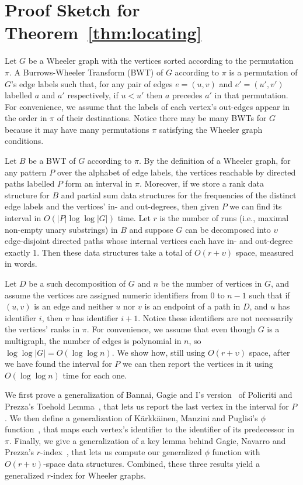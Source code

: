 
\section{Proof Sketch for Theorem~\ref{thm:locating}}
\label{app:locating}

Let $G$ be a Wheeler graph with the vertices sorted according to the permutation~$\pi$.  A Burrows-Wheeler Transform (BWT) of $G$ according to $\pi$ is a permutation of $G$'s edge labels such that, for any pair of edges $e = (u, v)$ and $e' = (u', v')$ labelled $a$ and $a'$ respectively, if $u < u'$ then $a$ precedes $a'$ in that permutation.  For convenience, we assume that the labels of each vertex's out-edges appear in the order in $\pi$ of their destinations.  Notice there may be many BWTs for $G$ because it may have many permutations $\pi$ satisfying the Wheeler graph conditions.

Let $B$ be a BWT of $G$ according to $\pi$.  By the definition of a Wheeler graph, for any pattern $P$ over the alphabet of edge labels, the vertices reachable by directed paths labelled $P$ form an interval in $\pi$.  Moreover, if we store a rank data structure for $B$ and partial sum data structures for the frequencies of the distinct edge labels and the vertices' in- and out-degrees, then given $P$ we can find its interval in $O (|P| \log \log |G|)$ time.  Let $r$ is the number of runs (i.e., maximal non-empty unary substrings) in $B$ and suppose $G$ can be decomposed into $\upsilon$ edge-disjoint directed paths whose internal vertices each have in- and out-degree exactly 1.  Then these data  structures take a total of $O (r + \upsilon)$ space, measured in words.

Let $D$ be a such decomposition of $G$ and $n$ be the number of vertices in $G$, and assume the vertices are assigned numeric identifiers from 0 to $n - 1$ such that if $(u, v)$ is an edge and neither $u$ nor $v$ is an endpoint of a path in $D$, and $u$ has identifier $i$, then $v$ has identifier $i + 1$.  Notice these identifiers are not necessarily the vertices' ranks in $\pi$.  For convenience, we assume that even though $G$ is a multigraph, the number of edges is polynomial in $n$, so $\log \log |G| = O (\log \log n)$.  We show how, still using $O (r + \upsilon)$ space, after we have found the interval for $P$ we can then report the vertices in it using $O (\log \log n)$ time for each one.

We first prove a generalization of Bannai, Gagie and I's version~\cite{bannai2020refining} of Policriti and Prezza's Toehold Lemma~\cite{policriti2018lz77}, that lets us report the last vertex in the interval for $P$.  We then define a generalization of K\"arkk\"ainen, Manzini and Puglisi's $\phi$ function~\cite{karkkainen2009permuted}, that maps each vertex's identifier to the identifier of its predecessor in $\pi$.  Finally, we give a generalization of a key lemma behind Gagie, Navarro and Prezza's $r$-index~\cite{gagie2020fully}, that lets us compute our generalized $\phi$ function with $O (r + \upsilon)$-space data structures.  Combined, these three results yield a generalized $r$-index for Wheeler graphs.

